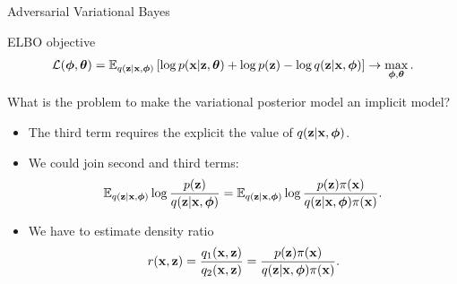 \begin{frame}{Adversarial Variational Bayes}
	\begin{block}{ELBO objective}
		\vspace{-0.5cm}
		\[
			 \mathcal{L} (\boldsymbol{\phi}, \boldsymbol{\theta})  = \mathbb{E}_{q(\mathbf{z} | \mathbf{x}, \boldsymbol{\phi})} \left[\log p(\mathbf{x} | \mathbf{z}, \boldsymbol{\theta}) + \log p(\mathbf{z}) - \log q(\mathbf{z}| \mathbf{x}, \boldsymbol{\phi}) \right] \rightarrow \max_{\boldsymbol{\phi}, \boldsymbol{\theta}}.
		\]	
		\vspace{-0.5cm}
	\end{block}
	What is the problem to make the variational posterior model an implicit model?
	\begin{itemize}
	\item The third term requires the explicit the value of $q(\mathbf{z} | \mathbf{x}, \boldsymbol{\phi})$.
	\item We could join second and third terms:
		\vspace{-0.2cm}
		\[
			\mathbb{E}_{q(\mathbf{z} | \mathbf{x}, \boldsymbol{\phi})} \log \frac{p(\mathbf{z})}{q(\mathbf{z}| \mathbf{x}, \boldsymbol{\phi})} = \mathbb{E}_{q(\mathbf{z} | \mathbf{x}, \boldsymbol{\phi})} \log \frac{p(\mathbf{z}) \pi(\mathbf{x})}{q(\mathbf{z}| \mathbf{x}, \boldsymbol{\phi}) \pi (\mathbf{x})}.
		\]
		\vspace{-0.5cm}
	\item We have to estimate density ratio 
		\vspace{-0.2cm}
		\[
			r(\mathbf{x}, \mathbf{z}) = \frac{q_1(\mathbf{x}, \mathbf{z})}{q_2(\mathbf{x}, \mathbf{z})} = \frac{p(\mathbf{z}) \pi(\mathbf{x})}{q(\mathbf{z}| \mathbf{x}, \boldsymbol{\phi}) \pi (\mathbf{x})}.
		\] 
	\end{itemize}
\end{frame}
